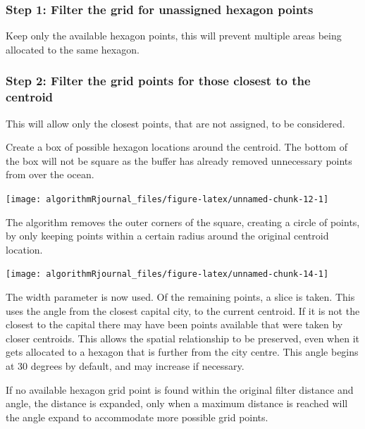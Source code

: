 \hypertarget{step-1-filter-the-grid-for-unassigned-hexagon-points}{%
\subsubsection{Step 1: Filter the grid for unassigned hexagon
points}\label{step-1-filter-the-grid-for-unassigned-hexagon-points}}

Keep only the available hexagon points, this will prevent multiple areas
being allocated to the same hexagon.

\hypertarget{step-2-filter-the-grid-points-for-those-closest-to-the-centroid}{%
\subsubsection{Step 2: Filter the grid points for those closest to the
centroid}\label{step-2-filter-the-grid-points-for-those-closest-to-the-centroid}}

This will allow only the closest points, that are not assigned, to be
considered.

Create a box of possible hexagon locations around the centroid. The
bottom of the box will not be square as the buffer has already removed
unnecessary points from over the ocean.

\begin{Schunk}

\texttt{[image: algorithmRjournal\_files/figure-latex/unnamed-chunk-12-1]} \end{Schunk}

The algorithm removes the outer corners of the square, creating a circle
of points, by only keeping points within a certain radius around the
original centroid location.

\begin{Schunk}

\texttt{[image: algorithmRjournal\_files/figure-latex/unnamed-chunk-14-1]} \end{Schunk}

The width parameter is now used. Of the remaining points, a slice is
taken. This uses the angle from the closest capital city, to the current
centroid. If it is not the closest to the capital there may have been
points available that were taken by closer centroids. This allows the
spatial relationship to be preserved, even when it gets allocated to a
hexagon that is further from the city centre. This angle begins at 30
degrees by default, and may increase if necessary.

If no available hexagon grid point is found within the original filter
distance and angle, the distance is expanded, only when a maximum
distance is reached will the angle expand to accommodate more possible
grid points.

